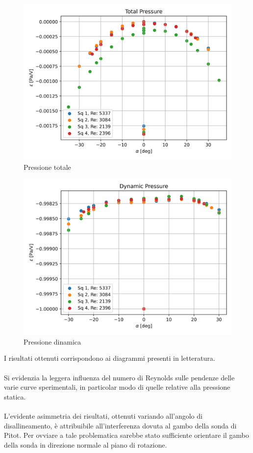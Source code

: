 \begin{figure}[h!]
    \centering
    \includegraphics[width=.76\textwidth]{images/2/ptot.png}
    \caption{Pressione totale}
\end{figure}

\newpage
\begin{figure}[ht]
    \centering
    \includegraphics[width=.76\textwidth]{images/2/q.png}
    \caption{Pressione dinamica}
\end{figure}

\noindent I risultati ottenuti corrispondono ai diagrammi presenti in letteratura.\\\\
Si evidenzia la leggera influenza del numero di Reynolds sulle pendenze delle varie curve sperimentali, in particolar modo di quelle relative alla pressione statica.\\\\
L'evidente asimmetria dei risultati, ottenuti variando all'angolo di disallineamento, è attribuibile all'interferenza dovuta al gambo della sonda di Pitot. Per ovviare a tale problematica sarebbe stato sufficiente orientare il gambo della sonda in direzione normale al piano di rotazione.

